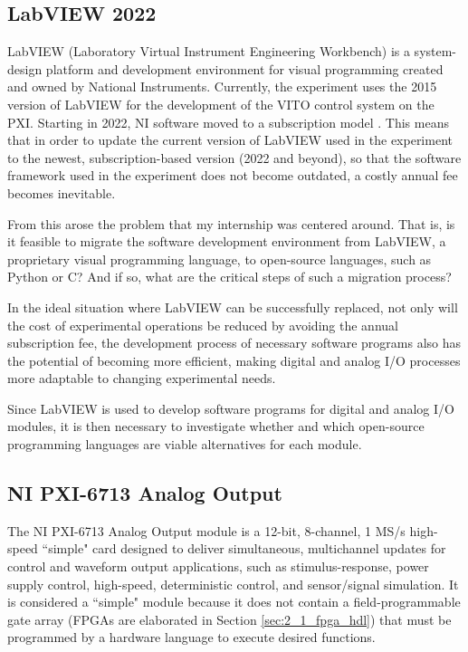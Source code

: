 \subsection{LabVIEW 2022}

LabVIEW (Laboratory Virtual Instrument Engineering Workbench) is a system-design platform and development environment for visual programming created and owned by National Instruments. Currently, the experiment uses the 2015 version of LabVIEW for the development of the VITO control system on the PXI. Starting in 2022, NI software moved to a subscription model \cite{ni}. This means that in order to update the current version of LabVIEW used in the experiment to the newest, subscription-based version (2022 and beyond), so that the software framework used in the experiment does not become outdated, a costly annual fee becomes inevitable.

From this arose the problem that my internship was centered around. That is, is it feasible to migrate the software development environment from LabVIEW, a proprietary visual programming language, to open-source languages, such as Python or C? And if so, what are the critical steps of such a migration process?

In the ideal situation where LabVIEW can be successfully replaced, not only will the cost of experimental operations be reduced by avoiding the annual subscription fee, the development process of necessary software programs also has the potential of becoming more efficient, making digital and analog I/O processes more adaptable to changing experimental needs.

Since LabVIEW is used to develop software programs for digital and analog I/O modules, it is then necessary to investigate whether and which open-source programming languages are viable alternatives for each module.

\subsection{NI PXI-6713 Analog Output}

The NI PXI-6713 Analog Output module is a 12-bit, 8-channel, 1 MS/s high-speed ``simple" card designed to deliver simultaneous, multichannel updates for control and waveform output applications, such as stimulus-response, power supply control, high-speed, deterministic control, and sensor/signal simulation. It is considered a ``simple" module because it does not contain a field-programmable gate array (FPGAs are elaborated in Section \ref{sec:2_1_fpga_hdl}) that must be programmed by a hardware language to execute desired functions.

